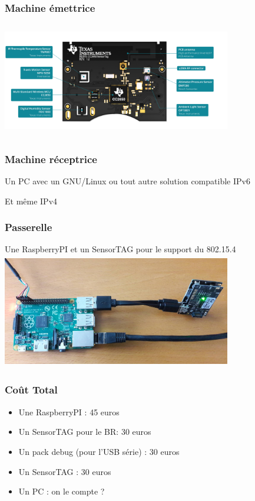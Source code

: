 \documentclass{smilebeamer}
\begin{document}
\begin{frame}
\frametitle{Machine émettrice}
\begin{center}

\includegraphics[width=10cm,height=5cm]{img/sensortag-teardown.png}


\end{center}
\end{frame}


\begin{frame}
\frametitle{Machine réceptrice}

Un PC avec un GNU/Linux ou tout autre solution compatible IPv6


Et même IPv4

\end{frame}

\begin{frame}
\frametitle{Passerelle}

Une RaspberryPI et un SensorTAG pour le support du 802.15.4
\includegraphics[width=10cm,height=5cm]{img/border_router.jpg}
\end{frame}

\begin{frame}
\frametitle{Coût Total}
\begin{itemize}
\item Une RaspberryPI : 45 euros
\item Un SensorTAG pour le BR: 30 euros
\item Un pack debug (pour l'USB série) : 30 euros
\item Un SensorTAG : 30 euros
\item Un PC : on le compte ?
\end{itemize}
\end{frame}
\end{document}

